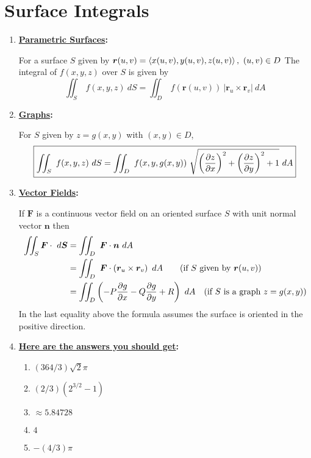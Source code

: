 \documentclass[12pt]{exam}
\newcommand{\qdate}{Surface Integrals} %
\begin{document}
\section*{\qdate}


\begin{enumerate}
    \item \textbf{\underline{Parametric Surfaces}:}

        For a surface \(S\) given by
        \(
            \bm{r}(u,v)=\left\langle x(u,v),y(u,v),z(u,v) \right\rangle,~(u,v)\in D
        \)
        The integral of \(f(x,y,z)\) over \(S\) is given by
        \[
            \boxed{\iint_S~f(x,y,z)~dS = \iint_{D}~f(\bm{r}(u,v))~|\bm{r}_u\times \bm{r}_v|~dA}
        \]
    \item \textbf{\underline{Graphs}:}

        For \(S\) given by \(z=g(x,y)\) with \((x,y)\in D\), 
        \[
            \boxed{\iint_S~f(x,y,z)~dS = \iint_D~f(x,y,g(x,y))~\sqrt{ \left(\dfrac{\partial z}{\partial x}\right)^2+\left(\dfrac{\partial z}{\partial y}\right)^2+1}~dA}
        \]
    \item \textbf{\underline{Vector Fields}:}

        If \(\bm{F}\) is a continuous vector field on an oriented surface \(S\) with unit normal vector \(\bm{n}\) then 
        \begin{align*}
            \iint_S\bm{F}\cdot~d\bm{S} & = \iint_D~\bm{F}\cdot \bm{n}~dA\\
            & = \iint_{D}~\bm{F}\cdot\left(\bm{r}_u\times\bm{r}_v\right)~dA\quad\quad \text{(if \(S\) given by \(\bm{r}(u,v)\))}\\
            & = \iint_D\left(-P\dfrac{\partial g}{\partial x}-Q\dfrac{\partial g}{\partial y}+R\right)~dA\quad \text{(if \(S\) is a graph \(z=g(x,y)\))}
        \end{align*}
        In the last equality above the formula assumes the surface is oriented in the positive direction.
    \item \textbf{\underline{Here are the answers you should get}:}
        \begin{enumerate}
            \item \((364/3)\sqrt{2}\pi\)
            \item \((2/3)\left(2^{3/2}-1\right)\)
            \item \(\approx 5.84728\)
            \item \(4\)
            \item \(-(4/3)\pi\)
        \end{enumerate}
    
\end{enumerate}
\end{document}
